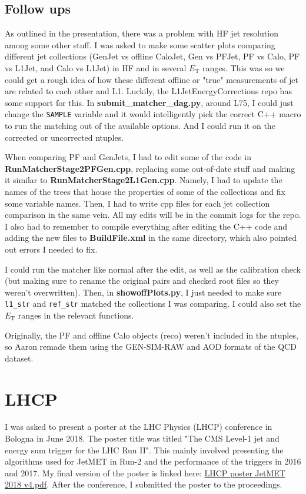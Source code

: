 \subsection{Follow ups}

As outlined in the presentation, there was a problem with HF jet resolution among some other stuff. I was asked to make some scatter plots comparing different jet collections (GenJet vs offline CaloJet, Gen vs PFJet, PF vs Calo, PF vs L1Jet, and Calo vs L1Jet) in HF and in several $E_{\mathrm{T}}$ ranges. This was so we could get a rough idea of how these different offline or "true" measurements of jet \pt are related to each other and L1. Luckily, the L1JetEnergyCorrections repo has some support for this. In \textbf{submit\_matcher\_dag.py}, around L75, I could just change the \texttt{SAMPLE} variable and it would intelligently pick the correct C++ macro to run the matching out of the available options. And I could run it on the corrected or uncorrected ntuples.

When comparing PF and GenJets, I had to edit some of the code in \textbf{RunMatcherStage2PFGen.cpp}, replacing some out-of-date stuff and making it similar to \textbf{RunMatcherStage2L1Gen.cpp}. Namely, I had to update the names of the trees that house the properties of some of the collections and fix some variable names. Then, I had to write cpp files for each jet collection comparison in the same vein. All my edits will be in the commit logs for the repo. I also had to remember to compile everything after editing the C++ code and adding the new files to \textbf{BuildFile.xml} in the same directory, which also pointed out errors I needed to fix.

I could run the matcher like normal after the edit, as well as the calibration check (but making sure to rename the original pairs and checked root files so they weren't overwritten). Then, in \textbf{showoffPlots.py}, I just needed to make sure \texttt{l1\_str} and \texttt{ref\_str} matched the collections I was comparing. I could also set the $E_{\mathrm{T}}$ ranges in the relevant functions.

Originally, the PF and offline Calo objects (reco) weren't included in the ntuples, so Aaron remade them using the GEN-SIM-RAW and AOD formats of the QCD dataset.

\section{LHCP}

I was asked to present a poster at the LHC Physics (LHCP) conference in Bologna in June 2018. The poster title was titled "The CMS Level-1 jet and energy sum trigger for the LHC Run II". This mainly involved presenting the algorithms used for JetMET in Run-2 and the performance of the triggers in 2016 and 2017. My final version of the poster is linked here: \href{run:./sec20/LHCP poster JetMET 2018 v4.pdf}{LHCP poster JetMET 2018 v4.pdf}. After the conference, I submitted the poster to the proceedings.
